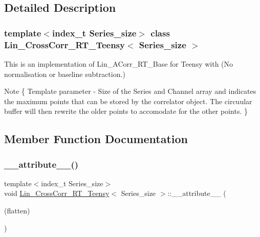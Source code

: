 \subsection{Detailed Description}
\subsubsection*{template$<$index\+\_\+t Series\+\_\+size$>$\newline
class Lin\+\_\+\+Cross\+Corr\+\_\+\+R\+T\+\_\+\+Teensy$<$ Series\+\_\+size $>$}

This is an implementation of Lin\+\_\+\+A\+Corr\+\_\+\+R\+T\+\_\+\+Base for Teensy with {\bfseries }(No normalisation or baseline subtraction.) 

\begin{DoxyNote}{Note}
\{ Template parameter -\/ Size of the Series and Channel array and indicates the maximum points that can be stored by the correlator object. The circuular buffer will then rewrite the older points to accomodate for the other points. \} 
\end{DoxyNote}


\subsection{Member Function Documentation}
\mbox{\label{classLin__CrossCorr__RT__Teensy_a33f639fa3a6f025d5a9ebe60b969cc55}} 
\subsubsection{\texorpdfstring{\+\_\+\+\_\+attribute\+\_\+\+\_\+()}{\_\_attribute\_\_()}\hspace{0.1cm}{\footnotesize\ttfamily [1/2]}}
{\footnotesize\ttfamily template$<$index\+\_\+t Series\+\_\+size$>$ \\
void \hyperlink{classLin__CrossCorr__RT__Teensy}{Lin\+\_\+\+Cross\+Corr\+\_\+\+R\+T\+\_\+\+Teensy}$<$ Series\+\_\+size $>$\+::\+\_\+\+\_\+attribute\+\_\+\+\_\+ (\begin{DoxyParamCaption}\item[{(flatten)}]{ }\end{DoxyParamCaption})}



